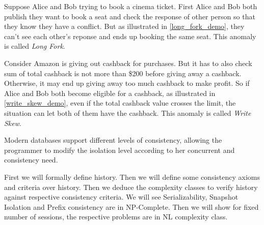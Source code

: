 Suppose Alice and Bob trying to book a cinema ticket. First Alice and Bob both publish they want to book a seat and check the response of other person so that they know they have a conflict. But as illustrated in \ref{long_fork_demo}, they can't see each other's reponse and ends up booking the same seat. This anomaly is called \textit{Long Fork}. 

Consider Amazon is giving out cashback for purchases. But it has to also check sum of total cashback is not more than \$200 before giving away a cashback. Otherwise, it may end up giving away too much cashback to make profit. So if Alice and Bob both become eligible for a cashback, as illustrated in \ref{write_skew_demo}, even if the total cashback value crosses the limit, the situation can let both of them have the cashback. This anomaly is called \textit{Write Skew}.

Modern databases support different levels of consistency, allowing the programmer to modify the isolation level according to her concurrent and consistency need.

First we will formally define history. Then we will define some consistency axioms and criteria over history. Then we deduce the complexity classes to verify history against respective consistency criteria. We will see Serializability, Snapshot Isolation and Prefix consistency are in NP-Complete. Then we will show for fixed number of sessions, the respective problems are in NL complexity class.

